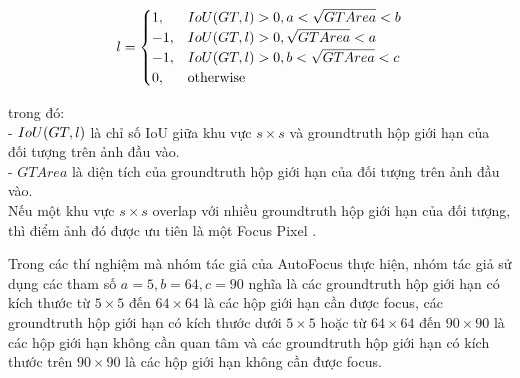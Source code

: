 {    \[l = 
        \begin{cases}
            1, & IoU\index{IoU}(GT, l) > 0, a < \sqrt{GTArea} < b \\
            -1, & IoU\index{IoU}(GT, l) > 0, \sqrt{GTArea} < a  \\
            -1, & IoU\index{IoU}(GT, l) > 0, b < \sqrt{GTArea} < c  \\
            0, & \text{otherwise}
        \end{cases}
    \]

    \noindent
    trong đó: \\
    - $IoU\index{IoU}(GT, l)$ là chỉ số IoU giữa khu vực $s \times s$ và groundtruth hộp giới hạn của đối tượng trên ảnh đầu vào. \\
    - $GTArea$ là diện tích của groundtruth hộp giới hạn của đối tượng trên ảnh đầu vào. \\
    Nếu một khu vực $s \times s$ overlap với nhiều groundtruth hộp giới hạn của đối tượng, thì điểm ảnh đó được ưu tiên là một Focus Pixel .

    \noindent
    Trong các thí nghiệm mà nhóm tác giả của AutoFocus \cite{najibi2019autofocus} thực hiện, nhóm tác giả sử dụng các tham số $a = 5, b = 64, c = 90$ nghĩa là các groundtruth hộp giới hạn có kích thước từ $5 \times 5$ đến $64 \times 64$ là các hộp giới hạn cần được focus, các groundtruth hộp giới hạn có kích thước dưới $5 \times 5$ hoặc từ $64 \times 64$ đến $90 \times 90$ là các hộp giới hạn không cần quan tâm và các groundtruth hộp giới hạn có kích thước trên $90 \times 90$ là các hộp giới hạn không cần được focus.
    
}
